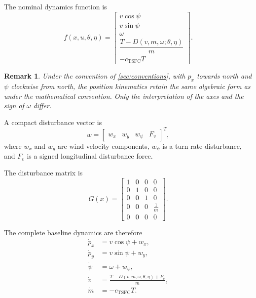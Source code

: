 \documentclass[11pt,a4paper]{article}
\newtheorem{remark}{Remark}
\newcommand{\vecx}{x}
\newcommand{\vecu}{u}
\newcommand{\vecw}{w}
\newcommand{\vectheta}{\theta}
\newcommand{\veceta}{\eta}
\newcommand{\vecf}{f}
\newcommand{\matG}{G}
\begin{document}
The nominal dynamics function is
\begin{equation}
  \vecf(\vecx, \vecu, \vectheta, \veceta) =
  \begin{bmatrix}
    v\cos\psi \\[2pt]
    v\sin\psi \\[2pt]
    \omega \\[2pt]
    \dfrac{T - D(v, m, \omega; \vectheta, \veceta)}{m} \\[8pt]
    -c_{\mathrm{TSFC}} T
  \end{bmatrix}.
  \label{eq:f-nominal}
\end{equation}

\begin{remark}
Under the convention of \cref{sec:conventions}, with $p_x$ towards north and
$\psi$ clockwise from north, the position kinematics retain the same algebraic
form as under the mathematical convention. Only the interpretation of the axes
and the sign of $\omega$ differ.
\end{remark}

A compact disturbance vector is
\begin{equation}
  \vecw = \begin{bmatrix} w_x & w_y & w_\psi & F_v \end{bmatrix}^{T},
\end{equation}
where $w_x$ and $w_y$ are wind velocity components, $w_\psi$ is a turn rate
disturbance, and $F_v$ is a signed longitudinal disturbance force.

The disturbance matrix is
\begin{equation}
  \matG(\vecx) =
  \begin{bmatrix}
    1 & 0 & 0 & 0 \\
    0 & 1 & 0 & 0 \\
    0 & 0 & 1 & 0 \\
    0 & 0 & 0 & \tfrac{1}{m} \\
    0 & 0 & 0 & 0
  \end{bmatrix}.
\end{equation}

The complete baseline dynamics are therefore
\begin{align}
  \dot p_x &= v\cos\psi + w_x, \\
  \dot p_y &= v\sin\psi + w_y, \\
  \dot\psi &= \omega + w_\psi, \\
  \dot v   &= \frac{T - D(v, m, \omega; \vectheta, \veceta) + F_v}{m}, \\
  \dot m   &= -c_{\mathrm{TSFC}} T .
\end{align}
\end{document}
